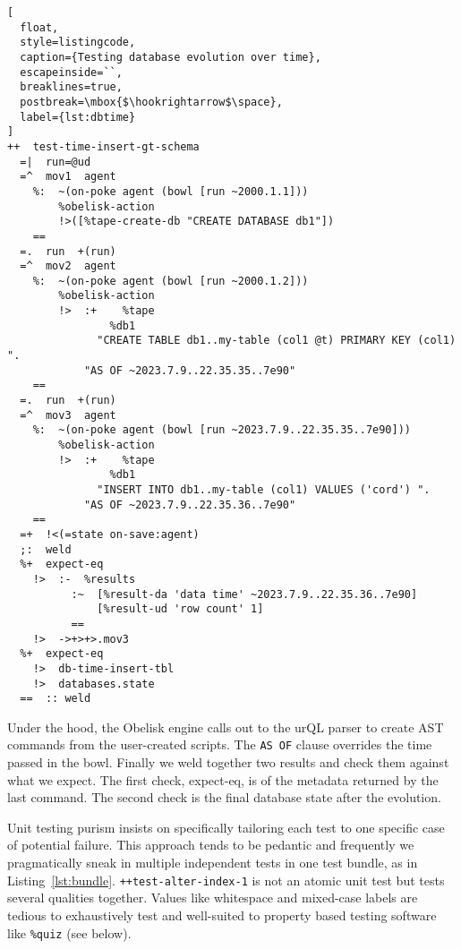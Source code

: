 \documentclass[twoside]{article}
\begin{document}
\begin{lstlisting}[
  float,
  style=listingcode,
  caption={Testing database evolution over time},
  escapeinside=``,
  breaklines=true,
  postbreak=\mbox{$\hookrightarrow$\space},
  label={lst:dbtime}
]
++  test-time-insert-gt-schema
  =|  run=@ud
  =^  mov1  agent  
    %:  ~(on-poke agent (bowl [run ~2000.1.1]))
        %obelisk-action
        !>([%tape-create-db "CREATE DATABASE db1"])
    ==
  =.  run  +(run)
  =^  mov2  agent  
    %:  ~(on-poke agent (bowl [run ~2000.1.2]))
        %obelisk-action
        !>  :+    %tape
                %db1
              "CREATE TABLE db1..my-table (col1 @t) PRIMARY KEY (col1) ".
            "AS OF ~2023.7.9..22.35.35..7e90"
    ==
  =.  run  +(run)
  =^  mov3  agent  
    %:  ~(on-poke agent (bowl [run ~2023.7.9..22.35.35..7e90]))
        %obelisk-action
        !>  :+    %tape 
                %db1 
              "INSERT INTO db1..my-table (col1) VALUES ('cord') ".
            "AS OF ~2023.7.9..22.35.36..7e90"
    ==
  =+  !<(=state on-save:agent)
  ;:  weld
  %+  expect-eq
    !>  :-  %results
          :~  [%result-da 'data time' ~2023.7.9..22.35.36..7e90]
              [%result-ud 'row count' 1]
          ==
    !>  ->+>+>.mov3
  %+  expect-eq
    !>  db-time-insert-tbl
    !>  databases.state
  ==  :: weld
\end{lstlisting}

Under the hood, the Obelisk engine calls out to the urQL parser to create AST commands from the user-created scripts. The \texttt{AS OF} clause overrides the time passed in the bowl. Finally we weld together two results and check them against what we expect. The first check, expect-eq, is of the metadata returned by the last command. The second check is the final database state after the evolution.

Unit testing purism insists on specifically tailoring each test to one specific case of potential failure. This approach tends to be pedantic and frequently we pragmatically sneak in multiple independent tests in one test bundle, as in Listing~\ref{lst:bundle}.  \texttt{++test-alter-index-1} is not an atomic unit test but tests several qualities together. Values like whitespace and mixed-case labels are tedious to exhaustively test and well-suited to property based testing software like \texttt{\%quiz} (see below).
\end{document}

